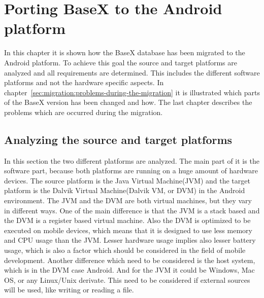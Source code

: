 \chapter{Porting BaseX to the Android platform}
\label{sec:migration:porting-basex-to-android}
In this chapter it is shown how the BaseX database has been migrated to the Android platform.
To achieve this goal the source and target platforms are analyzed and all requirements are determined.
This includes the different software platforms and not the hardware specific aspects. 
In chapter~\ref{sec:migration:problems-during-the-migration} it is illustrated which parts of the BaseX version has been changed and how.
The last chapter describes the problems which are occurred during the migration.


\section{Analyzing the source and target platforms} 
\label{sec:migration:analysing-the-source-and-target-platform}
In this section the two different platforms are analyzed.
The main part of it is the software part, because both platforms are running on a huge amount of hardware devices.
The source platform is the Java Virtual Machine(JVM) and the target platform is the Dalvik Virtual Machine(Dalvik VM, or DVM) in the Android environment.
The JVM and the DVM are both virtual machines, but they vary in different ways.
One of the main difference is that the JVM is a stack based and the DVM is a register based virtual machine.
Also the DVM is optimized to be executed on mobile devices, which means that it is designed to use less memory and CPU usage than the JVM.
Lesser hardware usage implies also lesser battery usage, which is also a factor which should be considered in the field of mobile development.
Another difference which need to be considered is the host system, which is in the DVM case Android.
And for the JVM it could be Windows, Mac OS, or any Linux/Unix derivate. 
This need to be considered if external sources will be used, like writing or reading a file.


